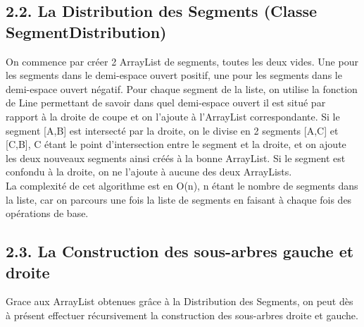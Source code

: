 \documentclass[a4paper,12pt]{report}	%
\begin{document}
    {\subsection*{2.2. La Distribution des Segments (Classe SegmentDistribution)}}
      On commence par créer 2 ArrayList de segments, toutes les deux vides. Une pour les segments dans le demi-espace ouvert positif, une pour
    les segments dans le demi-espace ouvert négatif.
    Pour chaque segment de la liste, on utilise la fonction de Line permettant de savoir dans quel demi-espace ouvert il est situé par rapport
    à la droite de coupe et on l'ajoute à l'ArrayList correspondante.
    Si le segment [A,B] est intersecté par la droite, on le divise en 2 segments [A,C] et [C,B], C étant le point d'intersection entre le segment
    et la droite, et on ajoute les deux nouveaux segments ainsi créés à la bonne ArrayList.
    Si le segment est confondu à la droite, on ne l'ajoute à aucune des deux ArrayLists.\\
    La complexité de cet algorithme est en O(n), n étant le nombre de segments dans la liste, car on parcours une fois la liste de segments en faisant à chaque fois des opérations de base.\\
     
       
    {\subsection*{2.3. La Construction des sous-arbres gauche et droite}}
      Grace aux ArrayList obtenues grâce à la Distribution des Segments, on peut dès à présent effectuer récursivement la construction des sous-arbres droite et gauche.\\
    
    \newpage 
    
\end{document}
